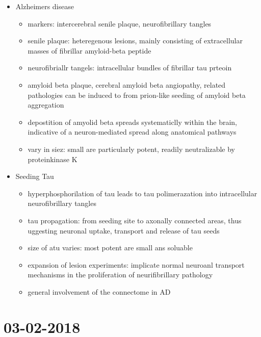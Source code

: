 \documentclass[fleqn]{article}\usepackage{caption}
\begin{document}
\begin{itemize}
\item Alzheimers disease 
\begin{itemize}
\item markers: intercerebral senile plaque, neurofibrillary tangles
\item senile plaque: heteregenous lesions, mainly consisting of extracellular masses of fibrillar amyloid-beta peptide
\item neurofibriallr tangels: intracellular bundles of fibrillar tau prteoin
\item amyloid beta plaque, cerebral amyloid beta angiopathy, related pathologies can be induced to from prion-like seeding of amyloid beta aggregation
\item depostition of amyolid beta spreads systematiclly within the brain, indicative of a neuron-mediated spread along anatomical pathways
\item vary in siez: small are particularly potent, readily neutralizable by proteinkinase K
\end{itemize}
\item Seeding Tau
\begin{itemize}
\item hyperphosphorilation of tau leads to tau polimerazation into intracellular neurofibrillary tangles
\item tau propagation: from seeding site to axonally connected areas, thus uggesting neuronal uptake, transport and release of tau seeds
\item size of atu varies: most potent are small ans soluable
\item expansion of lesion experiments: implicate normal neuroanl transport mechanisms in the proliferation of neurifibrillary pathology
\item general involvement of the connectome in AD
\end{itemize} 
\end{itemize}


\section{03-02-2018}
\end{document}
